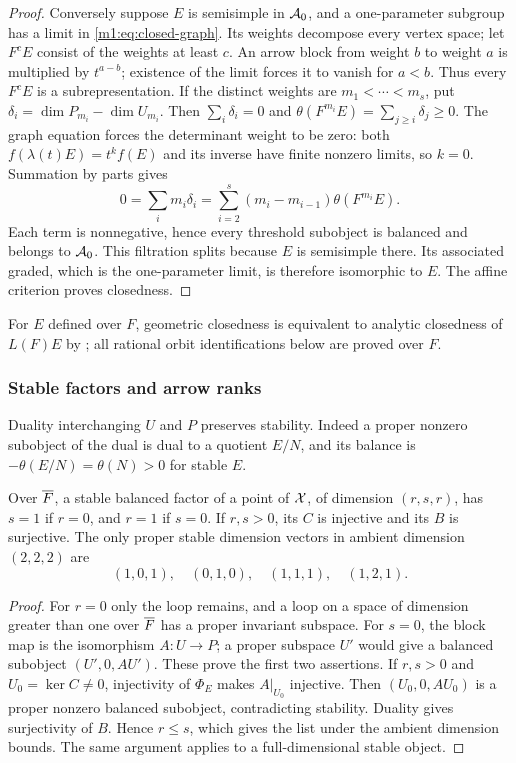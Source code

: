 \begin{proof}
Conversely suppose $E$ is semisimple in $\mathcal A_0$, and a one-parameter
subgroup has a limit in \eqref{m1:eq:closed-graph}. Its weights decompose
every vertex space; let $F^cE$ consist of the weights at least $c$.
An arrow block from weight $b$ to weight $a$ is multiplied by $t^{a-b}$;
existence of the limit forces it to vanish for $a<b$. Thus every $F^cE$
is a subrepresentation. If the distinct weights are
$m_1<\cdots<m_s$, put $\delta_i=\dim P_{m_i}-\dim U_{m_i}$. Then
$\sum_i\delta_i=0$ and $\theta(F^{m_i}E)=\sum_{j\geq i}\delta_j\geq0$.
The graph equation forces the determinant weight to be zero: both
$f(\lambda(t)E)=t^k f(E)$ and its inverse have finite nonzero limits,
so $k=0$. Summation by parts gives
\begin{equation}\label{m1:eq:balanced-weight-identity}
 0=\sum_i m_i\delta_i
   =\sum_{i=2}^s(m_i-m_{i-1})\theta(F^{m_i}E).
\end{equation}
Each term is nonnegative, hence every threshold subobject is balanced
and belongs to $\mathcal A_0$. This filtration splits because $E$ is
semisimple there. Its associated graded, which is the one-parameter
limit, is therefore isomorphic to $E$. The affine criterion proves
closedness.
\end{proof}
For $E$ defined over $F$, geometric closedness is
equivalent to analytic closedness of $L(F)E$ by
\cite[Theorem~2.3.8]{AGDescent}; all rational orbit identifications below
are proved over $F$.

\subsubsection{Stable factors and arrow ranks}\label{m1:subsec:stable-factors}
Duality interchanging $U$ and $P$ preserves stability. Indeed a proper
nonzero subobject of the dual is dual to a quotient $E/N$, and its
balance is $-\theta(E/N)=\theta(N)>0$ for stable $E$.

\begin{lemma}\label{m1:lem:stable-factors}
Over $\overline F$, a stable balanced factor of a point of $\mathcal X$, of dimension
$(r,s,r)$, has $s=1$ if $r=0$, and $r=1$ if $s=0$. If $r,s>0$, its
$C$ is injective and its $B$ is surjective. The only proper stable
dimension vectors in ambient dimension $(2,2,2)$ are
\[
 (1,0,1),\quad(0,1,0),\quad(1,1,1),\quad(1,2,1).
\]
\end{lemma}
\begin{proof}
For $r=0$ only the loop remains, and a loop on a space of dimension
greater than one over $\overline F$ has a proper invariant subspace. For $s=0$,
the block map is the isomorphism $A:U\to P$; a proper subspace $U'$
would give a balanced subobject $(U',0,AU')$. These prove the first two
assertions. If $r,s>0$ and $U_0=\ker C\neq0$, injectivity of $\Phi_E$
makes $A|_{U_0}$ injective. Then $(U_0,0,AU_0)$ is a proper nonzero
balanced subobject, contradicting stability. Duality gives surjectivity
of $B$. Hence $r\leq s$, which gives the list under the ambient
dimension bounds. The same argument applies to a full-dimensional
stable object.
\end{proof}

